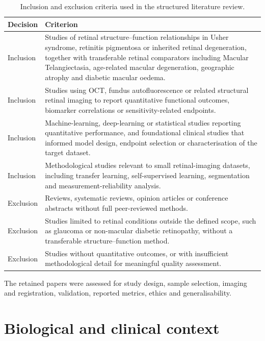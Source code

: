 \begin{table}[H]
\centering
\caption{Inclusion and exclusion criteria used in the structured literature review.}
\label{tab:review-criteria}
\begin{tabularx}{\textwidth}{@{}>{\raggedright\arraybackslash}p{}>{\raggedright\arraybackslash}X@{}}
\toprule
Decision & Criterion \\
\midrule
Inclusion & Studies of retinal structure--function relationships in Usher syndrome, retinitis pigmentosa or inherited retinal degeneration, together with transferable retinal comparators including Macular Telangiectasia, age-related macular degeneration, geographic atrophy and diabetic macular oedema. \\
Inclusion & Studies using OCT, fundus autofluorescence or related structural retinal imaging to report quantitative functional outcomes, biomarker correlations or sensitivity-related endpoints. \\
Inclusion & Machine-learning, deep-learning or statistical studies reporting quantitative performance, and foundational clinical studies that informed model design, endpoint selection or characterisation of the target dataset. \\
Inclusion & Methodological studies relevant to small retinal-imaging datasets, including transfer learning, self-supervised learning, segmentation and measurement-reliability analysis. \\
Exclusion & Reviews, systematic reviews, opinion articles or conference abstracts without full peer-reviewed methods. \\
Exclusion & Studies limited to retinal conditions outside the defined scope, such as glaucoma or non-macular diabetic retinopathy, without a transferable structure--function method. \\
Exclusion & Studies without quantitative outcomes, or with insufficient methodological detail for meaningful quality assessment. \\
\bottomrule
\end{tabularx}
\end{table}

The retained papers were assessed for study design, sample selection, imaging and registration, validation, reported metrics, ethics and generalisability.

\section{Biological and clinical context}

